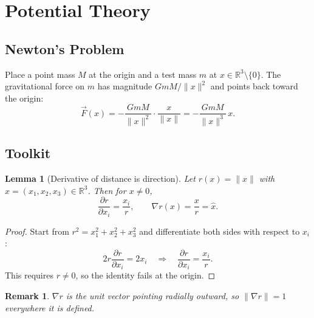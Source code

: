\documentclass{article}
\newtheorem{lemma}[theorem]{Lemma}
\newtheorem{remark}{Remark}
\begin{document}
\section{Potential Theory}

\subsection{Newton's Problem}
Place a point mass $M$ at the origin and a test mass $m$ at $x \in \mathbb{R}^3 \setminus \{0\}$. The gravitational force on $m$ has magnitude $GmM/\|x\|^2$ and points back toward the origin:
\begin{equation}
    \vec{F}(x) = -\frac{GmM}{\|x\|^2} \cdot \frac{x}{\|x\|} = -\frac{GmM}{\|x\|^3}\, x.
\end{equation}

\subsection{Toolkit}
\begin{lemma}[Derivative of distance is direction]
    Let $r(x) = \|x\|$ with $x = (x_1,x_2,x_3) \in \mathbb{R}^3$. Then for $x \neq 0$,
    \begin{equation}
        \frac{\partial r}{\partial x_i} = \frac{x_i}{r},
        \qquad
        \nabla r(x) = \frac{x}{r} = \hat{x}.
    \end{equation}
\end{lemma}
\begin{proof}
    Start from $r^2 = x_1^2 + x_2^2 + x_3^2$ and differentiate both sides with respect to $x_i$:
    \begin{equation}
        2r \frac{\partial r}{\partial x_i} = 2x_i
        \quad \Longrightarrow \quad
        \frac{\partial r}{\partial x_i} = \frac{x_i}{r}.
    \end{equation}
    This requires $r \neq 0$, so the identity fails at the origin.
\end{proof}
\begin{remark}
    $\nabla r$ is the unit vector pointing radially outward, so $\|\nabla r\| = 1$ everywhere it is defined.
\end{remark}
\end{document}
